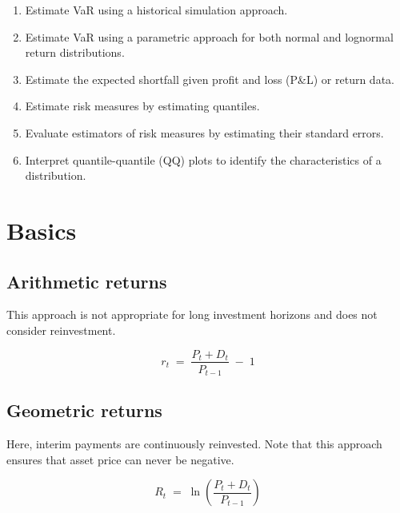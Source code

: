
\begin{mrkeybox}[title={Learning objectives in this reading}]
\small
\begin{enumerate}[label=\textbf{\alph*.},leftmargin=1.7em]
\item Estimate VaR using a historical simulation approach.
\item Estimate VaR using a parametric approach for both normal and lognormal return distributions.
\item Estimate the expected shortfall given profit and loss (P\&L) or return data.
\item Estimate risk measures by estimating quantiles.
\item Evaluate estimators of risk measures by estimating their standard errors.
\item Interpret quantile-quantile (QQ) plots to identify the characteristics of a distribution.
\end{enumerate}
\end{mrkeybox}

\section{Basics}

\subsection{Arithmetic returns}
This approach is not appropriate for long investment horizons and does not consider
reinvestment.

\begin{mrfmlbox}
\[ r_t \;=\; \frac{P_t + D_t}{P_{t-1}} \;-\; 1 \]
\end{mrfmlbox}

\subsection{Geometric returns}
Here, interim payments are continuously reinvested. Note that this approach ensures that
asset price can never be negative.

\begin{mrfmlbox}
\[ R_t \;=\; \ln\!\left( \frac{P_t + D_t}{P_{t-1}} \right) \]
\end{mrfmlbox}

